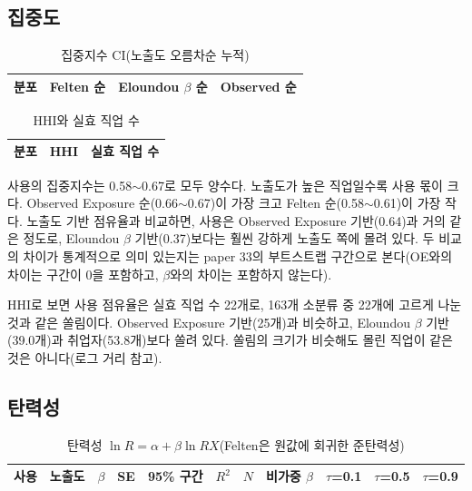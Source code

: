 \documentclass[11pt]{article}
\begin{document}
\subsection{집중도}

\begin{longtable}{L{6.4cm}R{2.6cm}R{2.6cm}R{2.6cm}}
\caption{집중지수 CI(노출도 오름차순 누적)}\label{tab:conc}\\
\toprule
분포 & Felten 순 & Eloundou $\beta$ 순 & Observed 순 \\
\midrule
\endfirsthead

\bottomrule
\end{longtable}

\begin{longtable}{L{8.0cm}R{3.0cm}R{3.0cm}}
\caption{HHI와 실효 직업 수}\label{tab:hhi}\\
\toprule
분포 & HHI & 실효 직업 수 \\
\midrule
\endfirsthead

\bottomrule
\end{longtable}

사용의 집중지수는 0.58$\sim$0.67로 모두 양수다. 노출도가 높은 직업일수록 사용 몫이 크다. Observed Exposure 순(0.66$\sim$0.67)이 가장 크고 Felten 순(0.58$\sim$0.61)이 가장 작다. 노출도 기반 점유율과 비교하면, 사용은 Observed Exposure 기반(0.64)과 거의 같은 정도로, Eloundou $\beta$ 기반(0.37)보다는 훨씬 강하게 노출도 쪽에 몰려 있다. 두 비교의 차이가 통계적으로 의미 있는지는 paper 33의 부트스트랩 구간으로 본다(OE와의 차이는 구간이 0을 포함하고, $\beta$와의 차이는 포함하지 않는다).

HHI로 보면 사용 점유율은 실효 직업 수 22개로, 163개 소분류 중 22개에 고르게 나눈 것과 같은 쏠림이다. Observed Exposure 기반(25개)과 비슷하고, Eloundou $\beta$ 기반(39.0개)과 취업자(53.8개)보다 쏠려 있다. 쏠림의 크기가 비슷해도 몰린 직업이 같은 것은 아니다(로그 거리 참고).

\subsection{탄력성}

\begin{footnotesize}
\begin{longtable}{L{1.2cm}L{2.9cm}R{0.9cm}R{0.9cm}R{1.9cm}R{0.8cm}R{0.8cm}R{1.2cm}R{1.0cm}R{1.0cm}R{1.0cm}}
\caption{탄력성 $\ln R = \alpha + \beta \ln RX$(Felten은 원값에 회귀한 준탄력성)}\label{tab:elas}\\
\toprule
사용 & 노출도 & $\beta$ & SE & 95\% 구간 & $R^2$ & $N$ & 비가중 $\beta$ & $\tau$=0.1 & $\tau$=0.5 & $\tau$=0.9 \\
\midrule
\endfirsthead

\bottomrule
\end{longtable}
\end{footnotesize}
\end{document}
